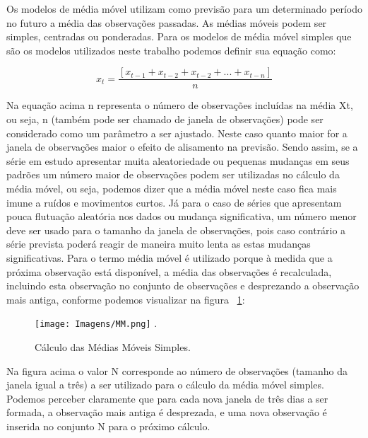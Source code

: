 Os modelos de média móvel utilizam como previsão para um determinado período no futuro a média das observações passadas. As médias móveis podem ser simples, centradas ou ponderadas. Para os modelos de média móvel simples que são os modelos utilizados neste trabalho podemos definir sua equação como:  

\begin{equation} 
	x_{t} = \frac {[x_{t-1} + x_{t-2} + x_{t-2} + . . . + x_{t-n}]}  {n}
\end{equation}

Na equação acima n representa o número de observações incluídas na média Xt, ou seja, n (também pode ser chamado de janela de observações) pode ser considerado como um parâmetro a ser ajustado. Neste caso quanto maior for a janela de observações maior o efeito de alisamento na previsão. Sendo assim, se a série em estudo apresentar muita aleatoriedade ou pequenas mudanças em seus padrões um número maior de observações podem ser utilizadas no cálculo da média móvel, ou seja, podemos dizer que a média móvel neste caso fica mais imune a ruídos e movimentos curtos. Já para o caso de séries que apresentam pouca flutuação aleatória nos dados ou mudança significativa, um número menor deve ser usado para o tamanho da janela de observações, pois caso contrário a série prevista poderá reagir de maneira muito lenta as estas mudanças significativas.   Para  o termo média móvel é utilizado porque à medida que a próxima observação está disponível, a média das observações é recalculada, incluindo esta observação no conjunto de observações e desprezando a observação mais antiga, conforme podemos visualizar na figura ~\ref{Fig:MMA}:

\begin{figure}[!t]
\centering
\texttt{[image: Imagens/MM.png]}
\DeclareGraphicsExtensions.
\caption{Cálculo das Médias Móveis Simples.}
\label{Fig:MMA}
\end{figure}

Na figura acima o valor N corresponde ao número de observações (tamanho da janela igual a três) a ser utilizado para o cálculo da média móvel simples. Podemos perceber claramente que para cada nova janela de três dias a ser formada, a observação mais antiga é desprezada, e uma nova observação é inserida no conjunto N para o próximo cálculo. 
